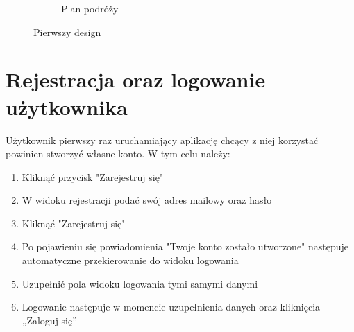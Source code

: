\documentclass[10pt,twoside,a4paper]{report}
\begin{document}
\begin{figure}[h]
\begin{subfigure}{0.3\textwidth}
\caption{Plan podróży}
\label{fig:firstDesign3}
\end{subfigure}
\caption{Pierwszy design}
\label{fig:podrecznik10}
\end{figure}
\FloatBarrier
\section{Rejestracja oraz logowanie użytkownika}
Użytkownik pierwszy raz uruchamiający aplikację chcący z niej korzystać powinien stworzyć własne konto. W tym celu należy:

\begin{enumerate}

\item Kliknąć przycisk "Zarejestruj się"
\item W widoku rejestracji podać swój adres mailowy oraz hasło
\item Kliknąć "Zarejestruj się"
\item Po pojawieniu się powiadomienia "Twoje konto zostało utworzone" następuje automatyczne przekierowanie do widoku logowania
\item Uzupełnić pola widoku logowania tymi samymi danymi
\item Logowanie następuje w momencie uzupełnienia danych oraz kliknięcia „Zaloguj się”

\end{enumerate}
\end{document}

